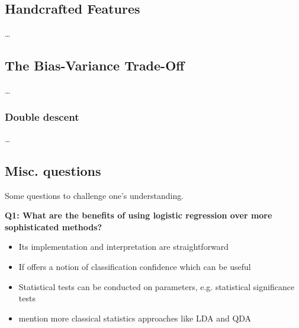 \documentclass[11pt]{article}
\begin{document}
\subsection{Handcrafted Features}
\dots

\subsection{The Bias-Variance Trade-Off}
\dots

\subsubsection{Double descent}
\dots

\subsection{Misc. questions}

Some questions to challenge one's understanding.

\begin{tcolorbox}[colback=c2]
\begin{center}
    \textbf{Q1: What are the benefits of using logistic regression over more sophisticated methods?}
\end{center}
\vspace{-8pt}
\begin{itemize}
    \item Its implementation and interpretation are straightforward
    \item If offers a notion of classification confidence which can be useful
    \item Statistical tests can be conducted on parameters, e.g. statistical significance tests
    \item mention more classical statistics approaches like LDA and QDA
\end{itemize}
\end{tcolorbox}
\end{document}
